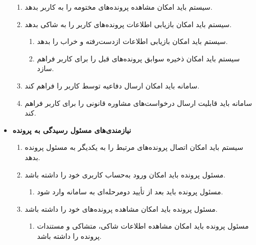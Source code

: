 \documentclass[12pt,a4paper,oneside]{article}
\begin{document}
\begin{itemize}
\begin{enumerate}
        \item 
        سیستم باید امکان مشاهده پرونده‌های مختومه را به کاربر بدهد.

        \item 
        سیستم باید امکان بازیابی اطلاعات پرونده‌های کاربر را به شاکی بدهد.
        \begin{enumerate}
            \renewcommand{\labelenumii}{\textbf{.R\arabic{enumi}.\arabic{enumii}}}
            \item 
            سیستم باید امکان بازیابی اطلاعات ازدست‌رفته و خراب را بدهد.
            \item 
            سیستم باید امکان ذخیره سوابق پرونده‌های قبل را برای کاربر فراهم سازد.
        \end{enumerate}

        \item 
        سامانه باید امکان ارسال دفاعیه توسط کاربر را فراهم کند.

        \item 
        سامانه باید قابلیت ارسال درخواست‌های مشاوره قانونی را برای کاربر فراهم کند.
    \end{enumerate}

    \item
    \textbf{نیازمندی‌های مسئول رسیدگی به پرونده}
    \begin{enumerate}
        \renewcommand{\labelenumi}{\textbf{.R\arabic{enumi}}}
        \setcounter{enumi}{35}

        \item 
        سیستم باید امکان اتصال پرونده‌های مرتبط را به یکدیگر به مسئول پرونده بدهد.

        \item 
        مسئول پرونده باید امکان ورود به‌حساب کاربری خود را داشته باشد.
        \begin{enumerate}
            \renewcommand{\labelenumii}{\textbf{.R\arabic{enumi}.\arabic{enumii}}}
            \item 
            مسئول پرونده باید بعد از تأیید دومرحله‌ای به سامانه وارد شود.
        \end{enumerate}

        \item 
        مسئول پرونده باید امکان مشاهده پرونده‌های خود را داشته باشد.
        \begin{enumerate}
            \renewcommand{\labelenumii}{\textbf{.R\arabic{enumi}.\arabic{enumii}}}
            \item 
            مسئول پرونده باید امکان مشاهده اطلاعات شاکی، متشاکی و مستندات پرونده را داشته باشد.
        \end{enumerate}


\end{enumerate}
\end{itemize}
\end{document}
